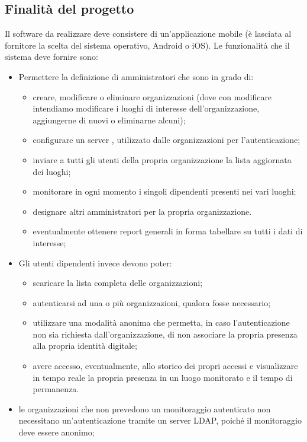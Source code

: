 \documentclass[../studio-di-fattibilita.tex]{subfiles}
\begin{document}
  \subsection{Finalità del progetto}%
  \label{subsec:finalita_del_progetto}
  Il software da realizzare deve consistere di un'applicazione mobile (è lasciata al fornitore la scelta del sistema operativo, Android o iOS). Le funzionalità che il sistema deve fornire sono:
  \begin{itemize}
    \item Permettere la definizione di amministratori che sono in grado di:
    \begin{itemize}
        \item creare, modificare o eliminare organizzazioni (dove con modificare intendiamo modificare i luoghi di interesse dell’organizzazione, aggiungerne di nuovi o eliminarne alcuni);
        \item configurare un server , utilizzato dalle organizzazioni per l'autenticazione;
        \item inviare a tutti gli utenti della propria organizzazione la lista aggiornata dei luoghi;
        \item monitorare in ogni momento i singoli dipendenti presenti nei vari luoghi;
        \item designare altri amministratori per la propria organizzazione.
        \item eventualmente ottenere report generali in forma tabellare su tutti i dati di interesse;
    \end{itemize}
    \item Gli utenti dipendenti invece devono poter:
    \begin{itemize}
        \item scaricare la lista completa delle organizzazioni;
        \item autenticarsi ad una o più organizzazioni, qualora fosse necessario;
        \item utilizzare una modalità anonima che permetta, in caso l’autenticazione non sia richiesta dall’organizzazione, di non associare la propria presenza alla propria identità digitale;
        \item avere accesso, eventualmente, allo storico dei propri accessi e visualizzare in tempo reale la propria presenza in un luogo monitorato e il tempo di permanenza.
    \end{itemize}
    \item le organizzazioni che non prevedono un monitoraggio autenticato non necessitano un'autenticazione tramite un server LDAP, poiché il monitoraggio deve essere anonimo;

\end{itemize}
\end{document}
